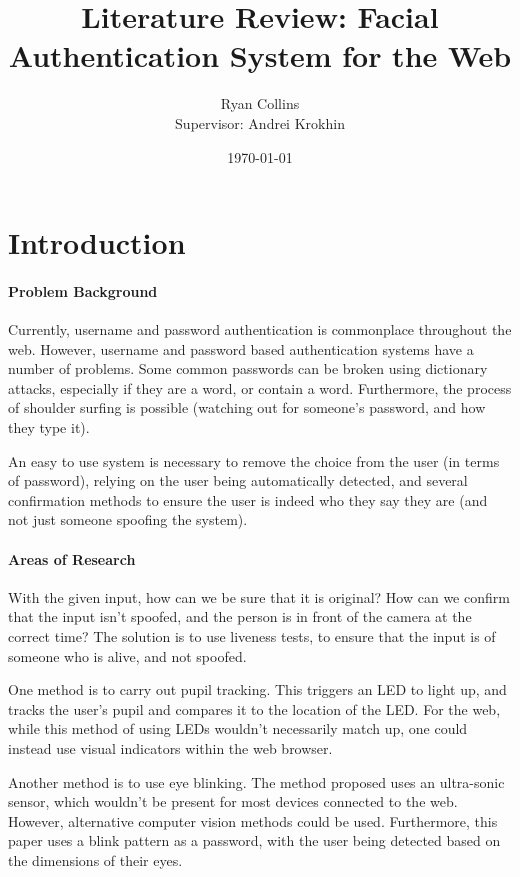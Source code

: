 \documentclass[14pt]{article}
\title{Literature Review: Facial Authentication System for the Web}
\author{
        Ryan Collins\\
        Supervisor: Andrei Krokhin
}
\date{\today}
\begin{document}
\maketitle

\section{Introduction}
\paragraph{Problem Background}
Currently, username and password authentication is commonplace throughout the web. However, username and password
based authentication systems have a number of problems. Some common passwords can be broken using dictionary attacks,
especially if they are a word, or contain a word. Furthermore, the process of shoulder surfing is possible (watching out
for someone's password, and how they type it).

An easy to use system is necessary to remove the choice from the user (in terms of password), relying on the user being automatically
detected, and several confirmation methods to ensure the user is indeed who they say they are (and not just someone spoofing the system).

\paragraph{Areas of Research}

With the given input, how can we be sure that it is original? How can we confirm that the input isn't spoofed,
and the person is in front of the camera at the correct time? The solution is to use liveness tests, to ensure
that the input is of someone who is alive, and not spoofed. 

One method is to carry out pupil tracking. This triggers an LED to light up, and tracks the user's pupil and
compares it to the location of the LED.
\cite{LivenessTestPupilTracking} For the web, while this method of using LEDs wouldn't necessarily match up,
one could instead use visual indicators within the web browser. 

Another method is to use eye blinking. The method proposed uses an ultra-sonic sensor,
which wouldn't be present for most devices connected to the web. However, alternative computer vision methods could be used.
Furthermore, this paper uses a blink pattern as a password, with the user being detected based on the dimensions of their eyes.\cite{LivenessTestBlinking}
\end{document}
